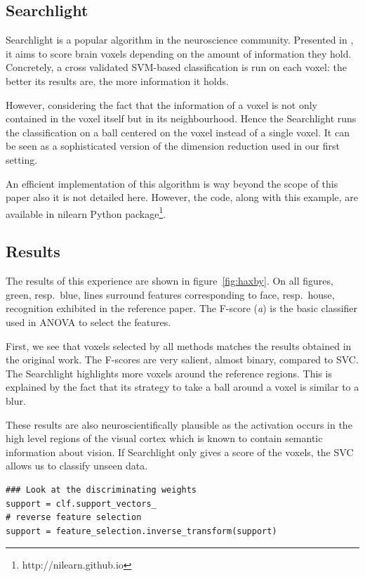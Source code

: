 \documentclass{frontiersSCNS} %
\newcounter{x}
\newcounter{y}
\begin{document}
\subsection{Searchlight}
\label{searchlight}

Searchlight is a popular algorithm in the neuroscience community.
Presented in \cite{kriegeskorte2006}, it aims to score
brain voxels depending on the amount of information they hold. Concretely, a
cross validated SVM-based classification is run on each voxel: the better its results are,
the more information it holds.

However, considering the fact that the information of a voxel is not only
contained in the voxel itself but in its neighbourhood. Hence the Searchlight
runs the classification on a ball centered on the voxel instead of a single voxel.
It can be seen as a sophisticated version of the dimension reduction used in our
first setting.

An efficient implementation of this algorithm is way beyond the scope of this
paper also it is not detailed here. However, the code, along with this example,
are available in nilearn Python package\footnote{http://nilearn.github.io}.

\subsection{Results}

The results of this experience are shown in figure~\ref{fig:haxby}.
On all figures, green, resp.\ blue,
lines surround features corresponding to face, resp.\ house, recognition
exhibited in the reference paper.
The F-score (\textit{a}) is the basic
classifier used in ANOVA to select the features.

First, we see that voxels selected by all methods matches the results obtained
in the original work. The F-scores are very salient, almost binary, compared to
SVC. The Searchlight highlights more voxels around the reference regions. This is
explained by the fact that its strategy to take a ball around a voxel
is similar to a blur.

These results are also neuroscientifically plausible as the activation occurs in the
high level regions of the visual cortex which is known to contain semantic
information about vision. If Searchlight only gives a score of the voxels, the
SVC allows us to classify unseen data.

\begin{lstlisting}
### Look at the discriminating weights
support = clf.support_vectors_
# reverse feature selection
support = feature_selection.inverse_transform(support)
\end{lstlisting}
\end{document}
